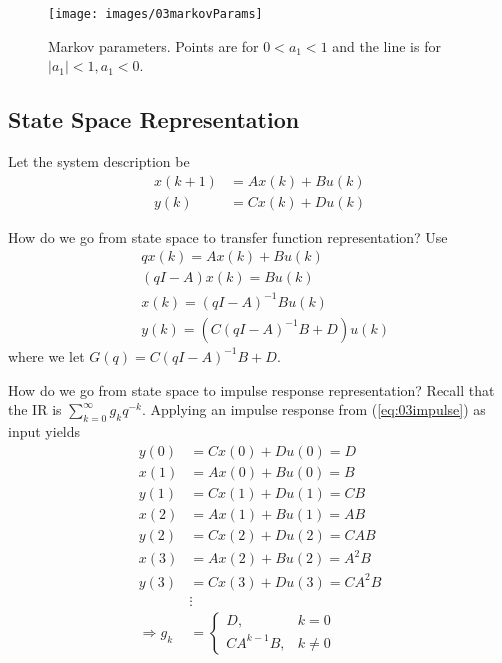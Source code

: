 \begin{figure}[ht!]
\centering
\texttt{[image: images/03markovParams]}
\caption{Markov parameters. Points are for $0<a_1<1$ and the line is for $|a_1|<1, a_1<0$.}
\label{fig:03markovParams}
\end{figure}

\subsection{State Space Representation}
Let the system description be
\begin{align*}
x(k+1) &= Ax(k) + Bu(k) \\
y(k) &= Cx(k) + Du(k)
\end{align*}

How do we go from state space to transfer function representation? Use
\begin{align*}
&qx(k) = Ax(k) + Bu(k) \\
&(qI-A)x(k) = Bu(k) \\
&x(k) = {(qI-A)}^{-1}Bu(k) \\
&y(k) = ({C(qI-A)}^{-1}B+D)u(k)
\end{align*}
where we let $G(q) = C{(qI-A)}^{-1}B+D$.

How do we go from state space to impulse response representation? Recall that the IR is $\sum_{k=0}^\infty g_k q^{-k}$.
Applying an impulse response from (\ref{eq:03impulse}) as input yields
\begin{align*}
y(0) &= Cx(0) + Du(0) = D \\
x(1) &= Ax(0) + Bu(0) = B \\
y(1) &= Cx(1) + Du(1) = CB \\
x(2) &= Ax(1) + Bu(1) = AB \\
y(2) &= Cx(2) + Du(2) = CAB \\
x(3) &= Ax(2) + Bu(2) = A^2B \\
y(3) &= Cx(3) + Du(3) = CA^2B \\
&\vdots \\
\Rightarrow g_k &= \begin{cases} D, & k=0 \\ CA^{k-1}B, & k\neq 0 \end{cases}
\end{align*}

